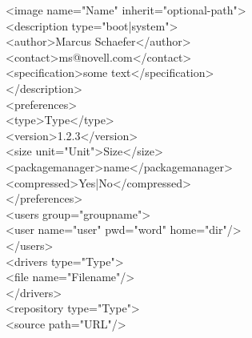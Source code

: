 \begin{itemize}
      \begin{Command}{15cm}
      <image name="Name" inherit="optional-path">\\
      \hspace*{1cm}<description type="boot|system">\\
      \hspace*{2cm}<author>Marcus Schaefer</author>\\
      \hspace*{2cm}<contact>ms@novell.com</contact>\\
      \hspace*{2cm}<specification>some text</specification>\\
      \hspace*{1cm}</description>\\
      \hspace*{1cm}<preferences>\\
      \hspace*{2cm}<type>Type</type>\\
      \hspace*{2cm}<version>1.2.3</version>\\
      \hspace*{2cm}<size unit="Unit">Size</size>\\
      \hspace*{2cm}<packagemanager>name</packagemanager>\\
      \hspace*{2cm}<compressed>Yes|No</compressed>\\
      \hspace*{1cm}</preferences>\\
      \hspace*{1cm}<users group="groupname">\\
      \hspace*{2cm}<user name="user" pwd="word" home="dir"/>\\
      \hspace*{1cm}</users>\\
      \hspace*{1cm}<drivers type="Type">\\
      \hspace*{2cm}<file name="Filename"/>\\
      \hspace*{1cm}</drivers>\\
      \hspace*{1cm}<repository type="Type">\\
      \hspace*{2cm}<source path="URL"/>\\

\end{Command}
\end{itemize}
